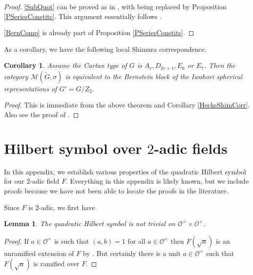 \documentclass[10pt, letterpaper]{amsart}
\theoremstyle{plain}
\newtheorem{Cor}[equation]{Corollary}
\newtheorem{Lem}[equation]{Lemma}
\theoremstyle{definition}
\numberwithin{equation}{section}
\newcommand{\Gt}{\widetilde{G}}
\newcommand{\Ocal}{\mathcal{O}}
\begin{document}
\begin{proof} 
\eqref{SubQuot} can be proved as in \cite[Theorem 7.1]{Karasiewicz}, with \cite[Proposition 7.4]{Karasiewicz} being replaced by Proposition \ref{PSeriesConstits}. This argument essentially follows \cite[(8.3) Theorem]{BK98}.

\eqref{BernComp} is already part of Proposition \ref{PSeriesConstits}.
\end{proof}


As a corollary, we have the following local Shimura correspondence.

\begin{Cor}\label{C:local_Shimura_Correspondence}
    Assume the Cartan type of $G$ is $A_r, D_{2r+1}, E_6$ or $E_7$. Then the category $\mathcal{M}(\Gt,\sigma)$ is equivalent to the Bernstein block of the Iwahori spherical representations of $G'=G\slash Z_2$.
\end{Cor}
\begin{proof}
    This is immediate from the above theorem and Corollary \ref{HeckeShimCorr}. Also see the proof of \cite[Theorem 8.1]{Karasiewicz}.
\end{proof}




\appendix


\section{Hilbert symbol over $2$-adic fields}\label{S:Appendix_Hilbert_symbol}


In this appendix, we establish various properties of the quadratic Hilbert symbol for our $2$-adic field $F$. Everything in this appendix is likely known, but we include proofs because we have not been able to locate the proofs in the literature.

Since $F$ is $2$-adic, we first have
\begin{Lem}
The quadratic Hilbert symbol is not trivial on $\Ocal^\times\times\Ocal^\times$.
\end{Lem}
\begin{proof}
If $a\in\Ocal^\times$ is such that $(a, b)=1$ for all $a\in\Ocal^\times$ then $F(\sqrt{a})$ is an unramified extension of $F$ by \cite[Exercise 5, p.209]{Serre}. But certainly there is a unit $a\in\Ocal^\times$ such that $F(\sqrt{a})$ is ramified over $F$. 
\end{proof}
\end{document}
